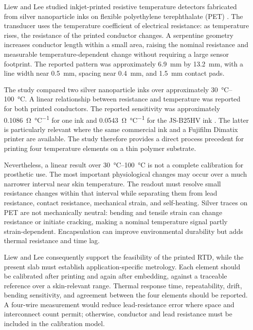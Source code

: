 \documentclass[12pt,a4paper]{article}
\begin{document}
Liew and Lee studied inkjet-printed resistive temperature detectors fabricated
from silver nanoparticle inks on flexible polyethylene terephthalate (PET)
\cite{liew2020}. The transducer uses the temperature coefficient of electrical
resistance: as temperature rises, the resistance of the printed conductor
changes. A serpentine geometry increases conductor length within a small area,
raising the nominal resistance and measurable temperature-dependent change
without requiring a large sensor footprint. The reported pattern was
approximately \SI{6.9}{\milli\metre} by \SI{13.2}{\milli\metre}, with a line
width near \SI{0.5}{\milli\metre}, spacing near
\SI{0.4}{\milli\metre}, and \SI{1.5}{\milli\metre} contact pads.

The study compared two silver nanoparticle inks over approximately
\SIrange{30}{100}{\degreeCelsius}. A linear relationship between resistance and
temperature was reported for both printed conductors. The reported sensitivity
was approximately \SI{0.1086}{\ohm\per\degreeCelsius} for one ink and
\SI{0.0543}{\ohm\per\degreeCelsius} for the JS-B25HV ink
\cite{liew2020}. The latter is particularly relevant where the same commercial
ink and a Fujifilm Dimatix printer are available. The study therefore provides
a direct process precedent for printing four temperature elements on a thin
polymer substrate.

Nevertheless, a linear result over \SIrange{30}{100}{\degreeCelsius} is not a
complete calibration for prosthetic use. The most important physiological
changes may occur over a much narrower interval near skin temperature. The
readout must resolve small resistance changes within that interval while
separating them from lead resistance, contact resistance, mechanical strain,
and self-heating. Silver traces on PET are not mechanically neutral: bending
and tensile strain can change resistance or initiate cracking, making a nominal
temperature signal partly strain-dependent. Encapsulation can improve
environmental durability but adds thermal resistance and time lag.

Liew and Lee consequently support the feasibility of the printed RTD, while the
present slab must establish application-specific metrology. Each element should
be calibrated after printing and again after embedding, against a traceable
reference over a skin-relevant range. Thermal response time, repeatability,
drift, bending sensitivity, and agreement between the four elements should be
reported. A four-wire measurement would reduce lead-resistance error where
space and interconnect count permit; otherwise, conductor and lead resistance
must be included in the calibration model.
\end{document}
